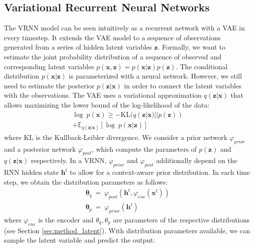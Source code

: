 \subsection{Variational Recurrent Neural Networks}
\label{background:vrnn}
The VRNN model \cite{chung2015recurrent} can be seen intuitively as a recurrent network with a VAE in every timestep.
It extends the VAE model to a sequence of observations generated from a series of hidden latent variables $\mathbf{z}$.
Formally, we want to estimate the joint probability distribution of a sequence of observed and corresponding latent variables $p(\mathbf{x}, \mathbf{z}) = p(\mathbf{x}|\mathbf{z})p(\mathbf{z})$.
The conditional distribution $p(\mathbf{x}|\mathbf{z})$ is parameterized with a neural network.
However, we still need to estimate the posterior $p(\mathbf{z}|\mathbf{x})$ in order to connect the latent variables with the observations.
The VAE uses a variational approximation $q(\mathbf{z}|\mathbf{x})$ that allows maximizing the lower bound of the log-likelihood of the data:
\begin{equation}
\begin{split}
    \log~p(\mathbf{x}) \ge -\mathrm{KL}(q(\mathbf{z}|\mathbf{x})||p(\mathbf{z}))\\ + \mathbb{E}_{q(\mathbf{z}|\mathbf{x})}[\log~p(\mathbf{x}|\mathbf{z})]
    \label{eq:vae}
\end{split}
\end{equation}
where KL is the Kullback-Leibler divergence.
We consider a prior  network $\varphi_{prior}$ and a posterior network $\varphi_{post}$, which compute the parameters of $p(\mathbf{z})$ and $q(\mathbf{z}|\mathbf{x})$ respectively.
In a VRNN, $\varphi_{prior}$ and $\varphi_{post}$ additionally depend on the RNN hidden state $\mathbf{h}^t$ to allow for a context-aware prior distribution.
In each time step, we obtain the distribution parameters as follows:
\begin{equation}
\label{eq:distr_theta}
\begin{gathered}
    \mathbf{\theta}_{q}~=~\varphi_{post}(\mathbf{h}^t, \varphi_{enc}(\mathbf{x}^t))\\
    \mathbf{\theta}_{p}~=~\varphi_{prior}(\mathbf{h}^t)
\end{gathered}
\end{equation}
where $\varphi_{enc}$ is the encoder and $\theta_q, \theta_p$ are parameters of the respective distributions (see Section \ref{sec:method_latent}).
With distribution parameters available, we can sample the latent variable and predict the output:
